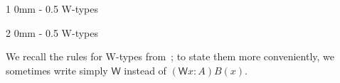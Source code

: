 \documentclass[reqno,10pt,a4paper,oneside]{amsart}
\makeatletter
\numberwithin{equation}{section}
\renewcommand{\section}{\@startsection
  {section}%
   {1}%
  {0mm}%
   {-\baselineskip}%
  {0.5\baselineskip}%
   {\Large\bfseries}}%
\renewcommand{\subsection}{\@startsection
  {subsection}%
  {2}%
  {0mm}%
  {-\baselineskip}%
  {0.5\baselineskip}%
  {\normalfont\normalsize\bf}}%
\theoremstyle{mythm}
\theoremstyle{mydef}
\theoremstyle{myrmk}
\newcommand{\prd}[1]{\Pi_{#1}}
\newcommand{\W}{\mathsf{W}}
\newcommand{\wsup}{\mathsf{sup}}
\newcommand{\wind}{\mathsf{wind}}
\newcommand{\UU}{\mathsf{U}}
\makeatother
\begin{document}
\section{W-types}
\label{section:wfiles}

\subsection{W-types}

We recall the rules for W-types from~\cite{MartinLofP:inttt}; to state them more conveniently, we sometimes write simply $\W$ instead of $(\W{x : A})B(x)$.

\begin{table}[ht]
\fbox{ 
\begin{minipage}{12cm}
\medskip
\begin{itemize}

\end{itemize}
\end{minipage}}
\end{table}
\end{document}
